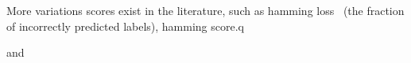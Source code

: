 
More variations scores exist in the literature, such as hamming loss~\cite{hammingLoss} (the fraction of incorrectly predicted labels), hamming score.q


 \cite{lossComp}

 \cite{MLTSVM} and \cite{MLTSVMThreeway}

